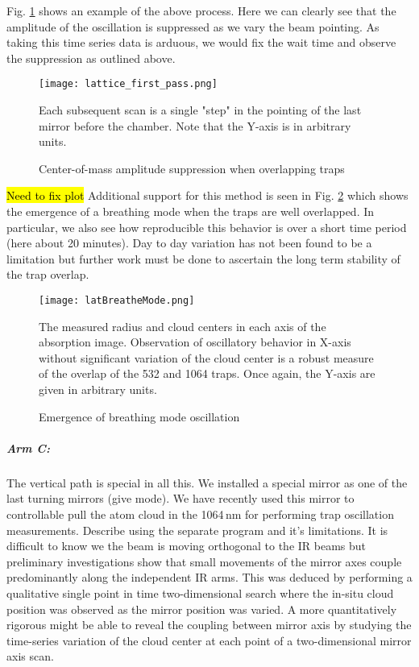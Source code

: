 Fig. \ref{fig:latFirtPass} shows an example of the above process.
Here we can clearly see that the amplitude of the oscillation is suppressed as we vary the beam pointing.
As taking this time series data is arduous, we would fix the wait time and observe the suppression as outlined above.
	\begin{figure} 
		\centerline{
		\texttt{[image: lattice\_first\_pass.png]}}
		\caption{Center-of-mass amplitude suppression when overlapping traps}{Each subsequent scan is a single "step" in the pointing of the last mirror before the chamber. Note that the Y-axis is in arbitrary units.}
		\label{fig:latFirtPass}
	\end{figure}
	
\hl{Need to fix plot} Additional support for this method is seen in Fig. \ref{fig:latBreatheMode} which shows the emergence of a breathing mode when the traps are well overlapped.
In particular, we also see how reproducible this behavior is over a short time period (here about 20 minutes).
Day to day variation has not been found to be a limitation but further work must be done to ascertain the long term stability of the trap overlap.
	\begin{figure} 
		\centerline{
		\texttt{[image: latBreatheMode.png]}}
		\caption{Emergence of breathing mode oscillation}{The measured radius and cloud centers in each axis of the absorption image. Observation of oscillatory behavior in X-axis without significant variation of the cloud center is a robust measure of the overlap of the 532 and 1064 traps. Once again, the Y-axis are given in arbitrary units.}
		\label{fig:latBreatheMode}
	\end{figure}
	
\subparagraph{Arm C:} \label{p:armCFirstPas}
The vertical path is special in all this.
We installed a special mirror as one of the last turning mirrors (give mode).
We have recently used this mirror to controllable pull the atom cloud in the 1064\,nm for performing trap oscillation measurements.
Describe using the separate program and it's limitations.
It is difficult to know we the beam is moving orthogonal to the IR beams but preliminary investigations show that small movements of the mirror axes couple predominantly along the independent IR arms.
This was deduced by performing a qualitative single point in time two-dimensional search where the in-situ cloud position was observed as the mirror position was varied.
A more quantitatively rigorous might be able to reveal the coupling between mirror axis by studying the time-series variation of the cloud center at each point of a two-dimensional mirror axis scan.


